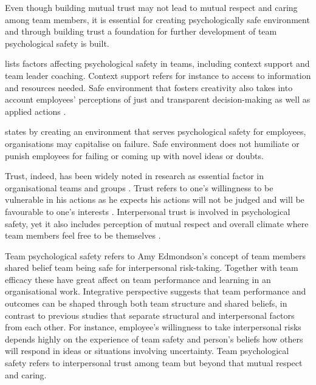 Even though building mutual trust may not lead to mutual respect and caring among team members, it is essential for creating psychologically safe environment and through building trust a foundation for further development of team psychological safety is built. \citep{edmondson1999psychological} 

\citet{edmondson1999psychological} lists factors affecting psychological safety in teams, including context support and team leader coaching. Context support refers for instance to access to information and resources needed. Safe environment that fosters creativity also takes into account employees' perceptions of just and transparent decision-making as well as applied actions \citep{shalley2004leaders}.

\citet{garvin2008yours} states by creating an environment that serves psychological safety for employees, organisations may capitalise on failure. Safe environment does not humiliate or punish employees for failing or coming up with novel ideas or doubts. 

Trust, indeed, has been widely noted in research as essential factor in organisational teams and groups \citep{golembiewski1975centrality,kramer1999trust,shalley2004leaders,edmondson1999psychological}. Trust refers to one's willingness to be vulnerable in his actions as he expects his actions will not be judged and will be favourable to one's interests \citep{robinson1997corporate}. Interpersonal trust is involved in psychological safety, yet it also includes perception of mutual respect and overall climate where team members feel free to be themselves \citep{edmondson1999psychological}. 

Team psychological safety refers to Amy Edmondson's concept of team members shared belief team being safe for interpersonal risk-taking. Together with team efficacy these have great affect on team performance and learning in an organisational work. \citep{edmondson1999psychological} Integrative perspective suggests that team performance and outcomes can be shaped through both team structure and shared beliefs, in contrast to previous studies that separate structural and interpersonal factors from each other. For instance, employee's willingness to take interpersonal risks depends highly on the experience of team safety and person's beliefs how others will respond in ideas or situations involving uncertainty. Team psychological safety refers to interpersonal trust among team but beyond that mutual respect and caring. \citep{edmondson1999psychological}

